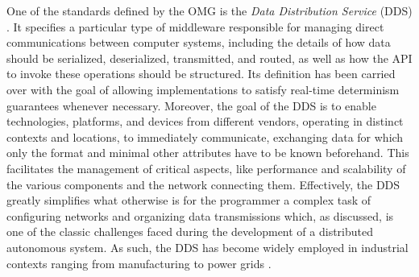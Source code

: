 One of the standards defined by the OMG is the \emph{Data Distribution Service} (DDS) \cite{pardo-castellote_omg_2003,schlesselman_omg_2004}. It specifies a particular type of middleware responsible for managing direct communications between computer systems, including the details of how data should be serialized, deserialized, transmitted, and routed, as well as how the API to invoke these operations should be structured. Its definition has been carried over with the goal of allowing implementations to satisfy real-time determinism guarantees whenever necessary. Moreover, the goal of the DDS is to enable technologies, platforms, and devices from different vendors, operating in distinct contexts and locations, to immediately communicate, exchanging data for which only the format and minimal other attributes have to be known beforehand. This facilitates the management of critical aspects, like performance and scalability of the various components and the network connecting them. Effectively, the DDS greatly simplifies what otherwise is for the programmer a complex task of configuring networks and organizing data transmissions which, as discussed, is one of the classic challenges faced during the development of a distributed autonomous system. As such, the DDS has become widely employed in industrial contexts ranging from manufacturing \cite{essers_evaluating_2014} to power grids \cite{saxena_distributed_2021}.


